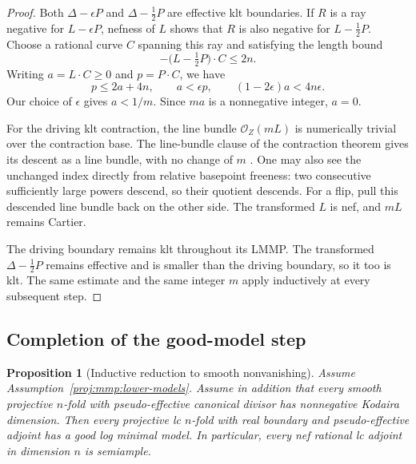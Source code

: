 \documentclass[11pt,letterpaper]{article}
\newcommand{\OO}{\mathcal{O}}
\newtheorem{proposition}[theorem]{Proposition}
\theoremstyle{definition}
\theoremstyle{remark}
\begin{document}
\begin{proof}
Both \(\Delta-\epsilon P\) and \(\Delta-\tfrac12P\) are
effective klt boundaries. If \(R\) is a ray negative for
\(L-\epsilon P\), nefness of \(L\) shows that \(R\) is also
negative for \(L-\tfrac12P\).
Choose a rational curve \(C\) spanning this ray and satisfying
the length bound
\[
 -\bigl(L-\tfrac12P\bigr)\cdot C\leq 2n.
\]
Writing \(a=L\cdot C\geq 0\) and \(p=P\cdot C\), we have
\[
 p\leq 2a+4n,\qquad a<\epsilon p,
 \qquad
 (1-2\epsilon)a<4n\epsilon.
\]
Our choice of \(\epsilon\) gives \(a<1/m\).
Since \(ma\) is a nonnegative integer, \(a=0\).

For the driving klt contraction, the line bundle
\(\OO_Z(mL)\) is numerically trivial over the contraction base.
The line-bundle clause of the contraction theorem gives its
descent as a line bundle, with no change of \(m\)
\cite[Theorem~3.74(3)]{Proj-Fujino2017}.
One may also see the unchanged index directly from relative
basepoint freeness: two consecutive sufficiently large powers
descend, so their quotient descends.
For a flip, pull this descended line bundle back on the other
side. The transformed \(L\) is nef, and \(mL\) remains Cartier.

The driving boundary remains klt throughout its LMMP.
The transformed \(\Delta-\tfrac12P\) remains effective and
is smaller than the driving boundary, so it too is klt.
The same estimate and the same integer \(m\) apply inductively
at every subsequent step.
\end{proof}

\subsection{Completion of the good-model step}

\begin{proposition}[Inductive reduction to smooth nonvanishing]
\label{proj:prop:inductive-reduction}
Assume Assumption~\ref{proj:mmp:lower-models}. Assume in addition that
every smooth projective \(n\)-fold with pseudo-effective
canonical divisor has nonnegative Kodaira dimension.
Then every projective lc \(n\)-fold with real boundary and
pseudo-effective adjoint has a good log minimal model.
In particular, every nef rational lc adjoint in dimension \(n\)
is semiample.
\end{proposition}
\end{document}
